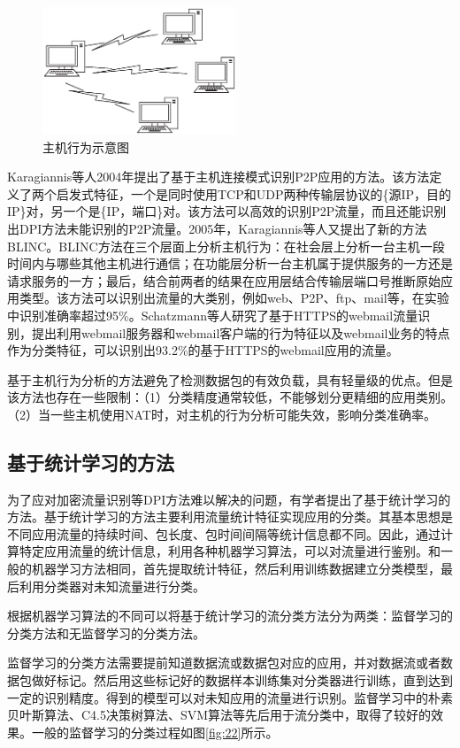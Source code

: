 \begin{figure}[thb]
\centering
\includegraphics[height=1.5in]{./figures/2/2-1}
\caption{主机行为示意图}
\label{fig:21}
\end{figure}

Karagiannis等人2004年提出了基于主机连接模式识别P2P应用的方法\supercite{karagiannis2004transport}。该方法定义了两个启发式特征，一个是同时使用TCP和UDP两种传输层协议的\{源IP，目的IP\}对，另一个是\{IP，端口\}对。该方法可以高效的识别P2P流量，而且还能识别出DPI方法未能识别的P2P流量。2005年，Karagiannis等人又提出了新的方法BLINC\supercite{karagiannis2005blinc}。BLINC方法在三个层面上分析主机行为：在社会层上分析一台主机一段时间内与哪些其他主机进行通信；在功能层分析一台主机属于提供服务的一方还是请求服务的一方；最后，结合前两者的结果在应用层结合传输层端口号推断原始应用类型。该方法可以识别出流量的大类别，例如web、P2P、ftp、mail等，在实验中识别准确率超过95\%。Schatzmann等人研究了基于HTTPS的webmail流量识别，提出利用webmail服务器和webmail客户端的行为特征以及webmail业务的特点作为分类特征，可以识别出93.2\%的基于HTTPS的webmail应用的流量\supercite{schatzmann2010digging}。

基于主机行为分析的方法避免了检测数据包的有效负载，具有轻量级的优点。但是该方法也存在一些限制：（1）分类精度通常较低，不能够划分更精细的应用类别。（2）当一些主机使用NAT时，对主机的行为分析可能失效，影响分类准确率。

\subsection{基于统计学习的方法}
为了应对加密流量识别等DPI方法难以解决的问题，有学者提出了基于统计学习的方法。基于统计学习的方法主要利用流量统计特征实现应用的分类。其基本思想是不同应用流量的持续时间、包长度、包时间间隔等统计信息都不同。因此，通过计算特定应用流量的统计信息，利用各种机器学习算法，可以对流量进行鉴别。和一般的机器学习方法相同，首先提取统计特征，然后利用训练数据建立分类模型，最后利用分类器对未知流量进行分类。

根据机器学习算法的不同可以将基于统计学习的流分类方法分为两类：监督学习的分类方法和无监督学习的分类方法。

监督学习的分类方法需要提前知道数据流或数据包对应的应用，并对数据流或者数据包做好标记。然后用这些标记好的数据样本训练集对分类器进行训练，直到达到一定的识别精度。得到的模型可以对未知应用的流量进行识别。监督学习中的朴素贝叶斯算法、C4.5决策树算法、SVM算法等先后用于流分类中，取得了较好的效果。一般的监督学习的分类过程如图\ref{fig:22}所示。

